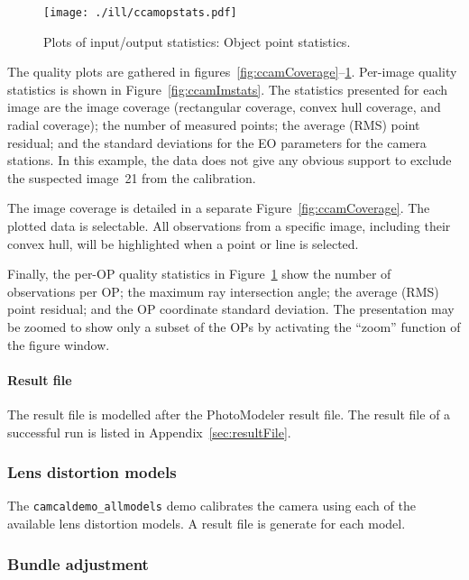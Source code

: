 \documentclass{article}
\begin{document}
\begin{figure}[tbp]
\centering
\texttt{[image: ./ill/ccamopstats.pdf]}
\caption{\label{fig:ccamOPstats}Plots of input/output statistics: Object point statistics.}
\end{figure}

The quality plots are gathered in
figures~\ref{fig:ccamCoverage}--\ref{fig:ccamOPstats}. Per-image quality
statistics is shown in Figure~\ref{fig:ccamImstats}. The statistics
presented for each image are the image coverage (rectangular coverage,
convex hull coverage, and radial coverage); the number of measured
points; the average (RMS) point residual; and the standard deviations
for the EO parameters for the camera stations. In this example, the
data does not give any obvious support to exclude the suspected
image~21 from the calibration.

The image coverage is detailed in a separate
Figure~\ref{fig:ccamCoverage}. The plotted data is selectable. All
observations from a specific image, including their convex hull, will
be highlighted when a point or line is selected.

Finally, the per-OP quality statistics in Figure~\ref{fig:ccamOPstats}
show the number of observations per OP; the maximum ray intersection
angle; the average (RMS) point residual; and the OP coordinate
standard deviation. The presentation may be zoomed to show only a
subset of the OPs by activating the ``zoom'' function of the figure
window.

\paragraph{Result file}
\label{sec:org85e3b0e}

The result file is modelled after the PhotoModeler result file. The
result file of a successful run is listed in
Appendix~\ref{sec:resultFile}.

\subsubsection{Lens distortion models}
\label{sec:org9ebd9cd}

The \texttt{camcaldemo\_allmodels} demo calibrates the camera using
each of the available lens distortion models. A result file is
generate for each model.

\subsubsection{Bundle adjustment}
\label{sec:orgc68981d}
\end{document}
